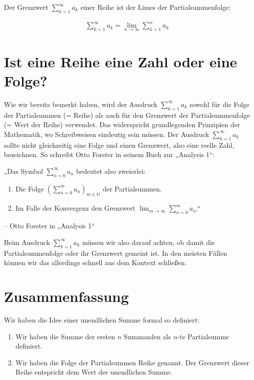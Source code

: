\documentclass[fontsize=9pt,
               parskip=half-,
               DIV=14,
               listof=chapterentry,
               tocflat]{scrbook}
\begin{document}
\begin{definition*}
Der Grenzwert $\sum _{k=1}^{\infty }a_{k}$ einer Reihe ist der Limes der Partialsummenfolge:

\begin{align*}
\sum _{k=1}^{\infty }a_{k}=\lim _{n\to \infty }\sum _{k=1}^{n}a_{k}
\end{align*}

\end{definition*}

\section{Ist eine Reihe eine Zahl oder eine Folge?}

Wie wir bereits bemerkt haben, wird der Ausdruck $\sum _{k=1}^{\infty }a_{k}$ sowohl für die Folge der Partialsummen (= Reihe) als auch für den Grenzwert der Partialsummenfolge (= Wert der Reihe) verwendet. Das widerspricht grundlegenden Prinzipien der Mathematik, wo Schreibweisen eindeutig sein müssen. Der Ausdruck $\sum _{k=1}^{\infty }a_{k}$ sollte nicht gleichzeitig eine Folge und einen Grenzwert, also eine reelle Zahl, bezeichnen. So schreibt Otto Forster in seinem Buch zur „Analysis 1“:

\begin{displayquote}
„Das Symbol $\sum _{n=0}^{\infty }a_{n}$ bedeutet also zweierlei: \begin{enumerate}
\item Die Folge $\left(\sum _{n=0}^{m}a_{n}\right)_{m\in \mathbb {N} }$ der Partialsummen.
\item Im Falle der Konvergenz den Grenzwert $\lim _{m\to \infty }\sum _{n=0}^{m}a_{n}$.“
\end{enumerate}

 – Otto Forster in „Analysis 1“\end{displayquote}

Beim Ausdruck $\sum _{k=1}^{\infty }a_{k}$ müssen wir also darauf achten, ob damit die Partialsummenfolge oder ihr Grenzwert gemeint ist. In den meisten Fällen können wir das allerdings schnell aus dem Kontext schließen.

\section{Zusammenfassung}

Wir haben die Idee einer unendlichen Summe formal so definiert:

\begin{enumerate}
\item Wir haben die Summe der ersten $n$ Summanden als $n$-te Partialsumme definiert.
\item Wir haben die Folge der Partialsummen Reihe genannt. Der Grenzwert dieser Reihe entspricht dem Wert der unendlichen Summe.
\end{enumerate}
\end{document}
